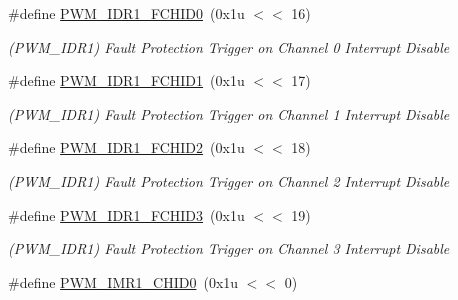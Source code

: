 \begin{DoxyCompactItemize}
\mbox{\label{group__SAMV71__PWM_ga5d0b864d7c46d711e67f258576bdb695}} 
\#define \mbox{\hyperlink{group__SAMV71__PWM_ga5d0b864d7c46d711e67f258576bdb695}{P\+W\+M\+\_\+\+I\+D\+R1\+\_\+\+F\+C\+H\+I\+D0}}~(0x1u $<$$<$ 16)
\begin{DoxyCompactList}\small\item\em (P\+W\+M\+\_\+\+I\+D\+R1) Fault Protection Trigger on Channel 0 Interrupt Disable \end{DoxyCompactList}\item 
\mbox{\label{group__SAMV71__PWM_ga976e7c6018476e56eb5499fe014ecd91}} 
\#define \mbox{\hyperlink{group__SAMV71__PWM_ga976e7c6018476e56eb5499fe014ecd91}{P\+W\+M\+\_\+\+I\+D\+R1\+\_\+\+F\+C\+H\+I\+D1}}~(0x1u $<$$<$ 17)
\begin{DoxyCompactList}\small\item\em (P\+W\+M\+\_\+\+I\+D\+R1) Fault Protection Trigger on Channel 1 Interrupt Disable \end{DoxyCompactList}\item 
\mbox{\label{group__SAMV71__PWM_gae1441d80727769a23cf3938e11040fe2}} 
\#define \mbox{\hyperlink{group__SAMV71__PWM_gae1441d80727769a23cf3938e11040fe2}{P\+W\+M\+\_\+\+I\+D\+R1\+\_\+\+F\+C\+H\+I\+D2}}~(0x1u $<$$<$ 18)
\begin{DoxyCompactList}\small\item\em (P\+W\+M\+\_\+\+I\+D\+R1) Fault Protection Trigger on Channel 2 Interrupt Disable \end{DoxyCompactList}\item 
\mbox{\label{group__SAMV71__PWM_gaba474b42f512547290bc189f1241469a}} 
\#define \mbox{\hyperlink{group__SAMV71__PWM_gaba474b42f512547290bc189f1241469a}{P\+W\+M\+\_\+\+I\+D\+R1\+\_\+\+F\+C\+H\+I\+D3}}~(0x1u $<$$<$ 19)
\begin{DoxyCompactList}\small\item\em (P\+W\+M\+\_\+\+I\+D\+R1) Fault Protection Trigger on Channel 3 Interrupt Disable \end{DoxyCompactList}\item 
\mbox{\label{group__SAMV71__PWM_ga9ee97f78b7948e40e46566ffbbcbe47c}} 
\#define \mbox{\hyperlink{group__SAMV71__PWM_ga9ee97f78b7948e40e46566ffbbcbe47c}{P\+W\+M\+\_\+\+I\+M\+R1\+\_\+\+C\+H\+I\+D0}}~(0x1u $<$$<$ 0)
$$
\end{DoxyCompactItemize}
